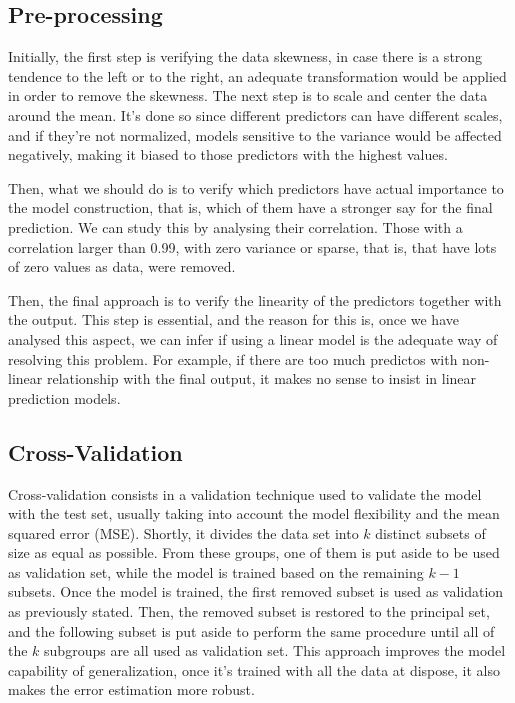 \documentclass[conference]{IEEEtran}
\begin{document}
\subsection{Pre-processing}

Initially, the first step is verifying the data skewness, in case there is a strong 
tendence to the left or to the right, an adequate transformation would be applied in order to 
remove the skewness. The next step is to scale and center the data around the mean. It's 
done so since different predictors can have different scales, and if they're not normalized,
models sensitive to the variance would be affected negatively, making it biased to those
predictors with the highest values. 

Then, what we should do is to verify which predictors have actual importance to the model 
construction, that is, which of them have a stronger say for the final prediction. We can 
study this by analysing their correlation. Those with a correlation larger than 0.99, with
zero variance or sparse, that is, that have lots of zero values as data, were removed.

Then, the final approach is to verify the linearity of the predictors together with the output. 
This step is essential, and the reason for this is, once we have analysed this aspect, we can
infer if using a linear model is the adequate way of resolving this problem. For example, 
if there are too much predictos with non-linear relationship with the final output, it makes no 
sense to insist in linear prediction models.

\subsection{Cross-Validation}

Cross-validation consists in a validation technique used to validate the model with the
test set, usually taking into account the model flexibility and the mean squared error (MSE).
Shortly, it divides the data set into $k$ distinct subsets of size as equal as 
possible. From these groups, one of them is put aside to be used as validation set,
while the model is trained based on the remaining $k-1$ subsets. Once the model is trained,
the first removed subset is used as validation as previously stated. Then, the removed 
subset is restored to the principal set, and the following subset is put aside to 
perform the same procedure until all of the $k$ subgroups are all used as validation set. 
This approach improves the model capability of generalization, once it's trained with 
all the data at dispose, it also makes the error estimation more robust.
\end{document}
